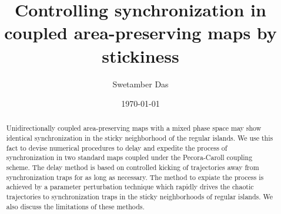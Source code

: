 \documentclass[reprint,amsmath,amssymb,aps,pre]{revtex4-1}
\begin{document}
\title{Controlling synchronization in coupled area-preserving maps by 
stickiness}

\author{Swetamber Das}

\date{\today}

\begin{abstract}
Unidirectionally coupled area-preserving maps with a mixed phase space may 
show identical synchronization in the sticky neighborhood of the regular 
islands. We use this fact to devise numerical procedures to 
delay and expedite the process of synchronization in two standard maps coupled 
under  the Pecora-Caroll coupling scheme. The delay method is based on 
controlled 
kicking of trajectories away from synchronization traps for as long as 
necessary. The method to expiate the process is
achieved by a parameter perturbation technique which rapidly drives the 
chaotic trajectories to synchronization traps in the sticky neighborhoods 
of regular islands. We also discuss the limitations of these methods.
\end{abstract}


\maketitle
\end{document}
